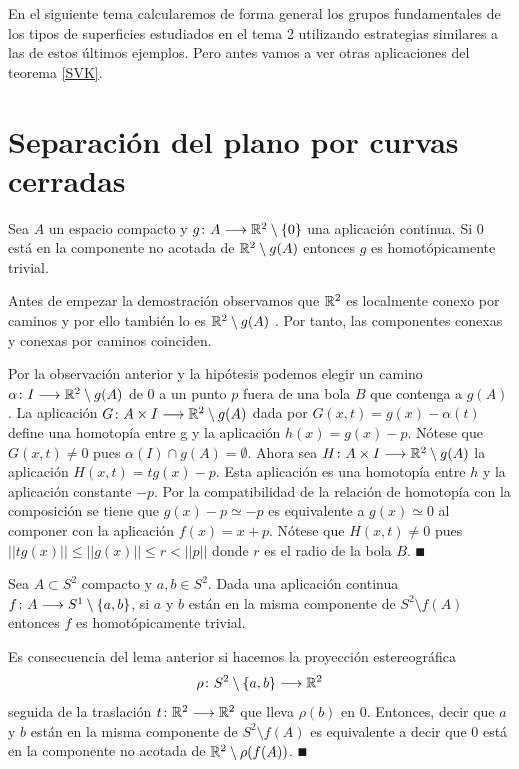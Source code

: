 \documentclass[GTS.tex]{subfiles}
\begin{document}
\vspace{0.4cm}

En el siguiente tema calcularemos de forma general los grupos fundamentales de los tipos de superficies estudiados en el tema 2 utilizando estrategias similares a las de estos últimos ejemplos. Pero antes vamos a ver otras aplicaciones del teorema \ref{SVK}.

\section{Separación del plano por curvas cerradas}

\begin{lemma}\label{1}
Sea $A$ un espacio compacto y $g\colon{A}\longrightarrow{\mathbb{R}^2\setminus\{0\}}$ una aplicación continua. Si $0$ está en la componente no acotada de $\mathbb{R}^2\setminus g(A)$  entonces $g$ es homotópicamente trivial.
\end{lemma}

Antes de empezar la demostración observamos que $\mathbb{R}^2$ es localmente conexo por caminos y por ello también lo es $\mathbb{R}^2\setminus g(A)$ . Por tanto, las componentes conexas y conexas por caminos coinciden.

\begin{dem}
Por la observación anterior y la hipótesis podemos elegir un camino $\alpha\colon{I}\longrightarrow{\mathbb{R}^2\setminus g(A)}$ de $0$ a un punto $p$ fuera de una bola $B$ que contenga a $g(A)$. La aplicación $G\colon{A\times I}\longrightarrow{\mathbb{R}^2\setminus g(A)}$ dada por $G(x,t)=g(x)-\alpha(t)$ define una homotopía entre g y la aplicación $h(x)=g(x)-p$. Nótese que $G(x,t)\neq 0$ pues $\alpha(I)\cap g(A)=\emptyset$. Ahora sea $H\colon{A\times I}\longrightarrow{\mathbb{R}^2\setminus g(A)}$ la aplicación $H(x,t)=tg(x)-p$. Esta aplicación es una homotopía entre $h$ y la aplicación constante $-p$. Por la compatibilidad de la relación de homotopía con la composición se tiene que $g(x)-p\simeq -p$ es equivalente a $g(x)\simeq 0$ al componer con la aplicación $f(x)=x+p$. Nótese que $H(x,t)\neq 0$ pues $||tg(x)||\leq||g(x)||\leq r <||p||$ donde $r$ es el radio de la bola $B$. $\QED$
\end{dem}

\begin{lemma}
Sea $A\subset S^2$ compacto y $a,b\in S^2$. Dada una aplicación continua $f\colon{A}\longrightarrow{S^1\setminus\{a,b\}}$, si $a$ y $b$ están en la misma componente de $S^2\setminus f(A)$ entonces $f$ es homotópicamente trivial. 
\end{lemma}

\begin{dem}
Es consecuencia del lema anterior si hacemos la proyección estereográfica \[\rho\colon{S^2\setminus\{a,b\}}\longrightarrow{\mathbb{R}^2}\] seguida de la traslación $t\colon{\mathbb{R}^2}\longrightarrow{\mathbb{R}^2}$ que lleva $\rho(b)$ en $0$. Entonces, decir que $a$ y $b$ están en la misma componente de $S^2\setminus f(A)$ es equivalente a decir que $0$ está en la componente no acotada de $\mathbb{R}^2\setminus\rho(f(A))$. $\QED$
\end{dem}
\end{document}

